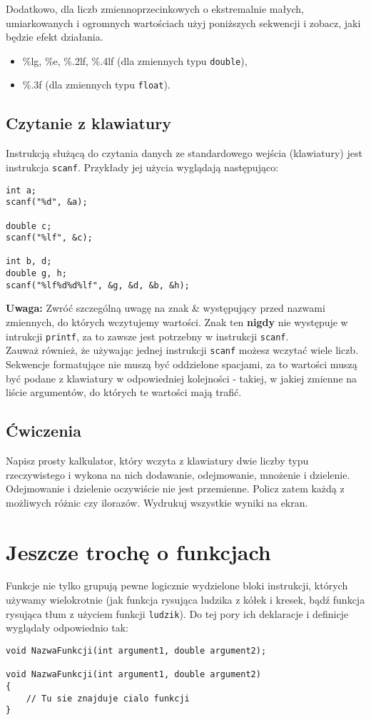\documentclass{instrukcja}
\begin{document}
Dodatkowo, dla liczb zmiennoprzecinkowych o ekstremalnie małych, umiarkowanych i ogromnych wartościach użyj poniższych sekwencji i zobacz, jaki będzie efekt działania.
\begin{itemize}
\item \%lg, \%e, \%.2lf, \%.4lf (dla zmiennych typu {\tt double}),
\item \%.3f (dla zmiennych typu {\tt float}).
\end{itemize}
\subsection*{Czytanie z klawiatury}
Instrukcją służącą do czytania danych ze standardowego wejścia (klawiatury) jest instrukcja {\tt scanf}. Przykłady jej użycia wyglądają następująco:
\begin {verbatim}
int a;
scanf("%

double c;
scanf("%

int b, d;
double g, h;
scanf("%
\end{verbatim}
{\bf Uwaga:} Zwróć szczególną uwagę na znak \& występujący przed nazwami zmiennych, do których wczytujemy wartości. Znak ten {\bf nigdy} nie występuje w intrukcji {\tt printf}, za to zawsze jest potrzebny w instrukcji {\tt scanf}.\\
Zauważ również, że używając jednej instrukcji {\tt scanf} możesz wczytać wiele liczb. Sekwencje formatujące nie muszą być oddzielone spacjami, za to wartości muszą być podane z klawiatury w odpowiedniej kolejności - takiej, w jakiej zmienne na liście argumentów, do których te wartości mają trafić.
\subsection*{Ćwiczenia}
Napisz prosty kalkulator, który wczyta z klawiatury dwie liczby typu rzeczywistego i wykona na nich dodawanie, odejmowanie, mnożenie i dzielenie. Odejmowanie i dzielenie oczywiście nie jest przemienne. Policz zatem każdą z możliwych różnic czy ilorazów. Wydrukuj wszystkie wyniki na ekran.
\section{Jeszcze trochę o funkcjach}
Funkcje nie tylko grupują pewne logicznie wydzielone bloki instrukcji, których używamy wielokrotnie (jak funkcja rysująca ludzika z kółek i kresek, bądź funkcja rysująca tłum z użyciem funkcji {\tt ludzik}). Do tej pory ich deklaracje i definicje wyglądały odpowiednio tak:
\begin{verbatim}
void NazwaFunkcji(int argument1, double argument2);

void NazwaFunkcji(int argument1, double argument2)
{
    // Tu sie znajduje cialo funkcji
}
\end{verbatim}
\end{document}
